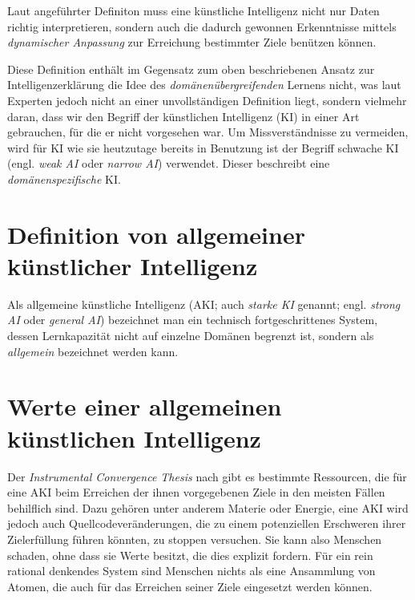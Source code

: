 Laut angeführter Definiton muss eine künstliche Intelligenz nicht nur Daten richtig interpretieren, sondern auch die dadurch gewonnen Erkenntnisse mittels \emph{dynamischer Anpassung} zur Erreichung bestimmter Ziele benützen können.

Diese Definition enthält im Gegensatz zum oben beschriebenen Ansatz zur Intelligenzerklärung die Idee des \emph{domänenübergreifenden} Lernens nicht, was laut Experten jedoch nicht an einer unvollständigen Definition liegt, sondern vielmehr daran, dass wir den Begriff der künstlichen Intelligenz (KI) in einer Art gebrauchen, für die er nicht vorgesehen war. Um Missverständnisse zu vermeiden, wird für KI wie sie heutzutage bereits in Benutzung ist der Begriff schwache KI (engl. \emph{weak AI} oder \emph{narrow AI}) verwendet.  Dieser beschreibt eine \emph{domänenspezifische} KI.

\section{Definition von allgemeiner künstlicher Intelligenz}
Als allgemeine künstliche Intelligenz (AKI; auch \emph{starke KI} genannt; engl. \emph{strong AI} oder \emph{general AI}) bezeichnet man ein technisch fortgeschrittenes System, dessen Lernkapazität nicht auf einzelne Domänen begrenzt ist, sondern als \emph{allgemein} bezeichnet werden kann. 

\section{Werte einer allgemeinen künstlichen Intelligenz}  \label{Werte}

Der \emph{Instrumental Convergence Thesis}  nach gibt es bestimmte Ressourcen, die für eine AKI beim Erreichen der ihnen vorgegebenen Ziele in den meisten Fällen behilflich sind. Dazu gehören unter anderem Materie oder Energie, eine AKI wird jedoch auch Quellcodeveränderungen, die zu einem potenziellen Erschweren ihrer Zielerfüllung führen könnten, zu stoppen versuchen. Sie kann also Menschen schaden, ohne dass sie Werte besitzt, die dies explizit fordern. Für ein rein rational denkendes System sind Menschen nichts als eine Ansammlung von Atomen, die auch für das Erreichen seiner Ziele eingesetzt werden können.

